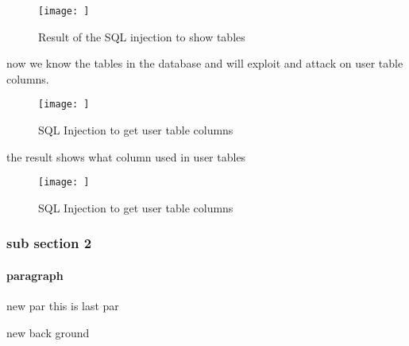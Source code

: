 \begin{figure}[h!]
	\texttt{[image: ]}
	\caption{Result of the SQL injection to show tables}
\end{figure}

now we know the tables in the database and will exploit and attack on user table columns.

\begin{figure}[h!]
	\texttt{[image: ]}
	\caption{SQL Injection to get user table columns}
\end{figure}

the result shows what column used in user tables

\begin{figure}[h!]
	\texttt{[image: ]}
	\caption{SQL Injection to get user table columns}
\end{figure}








\subsubsection{sub section 2}
\paragraph{paragraph}
new par this is last par

new back ground